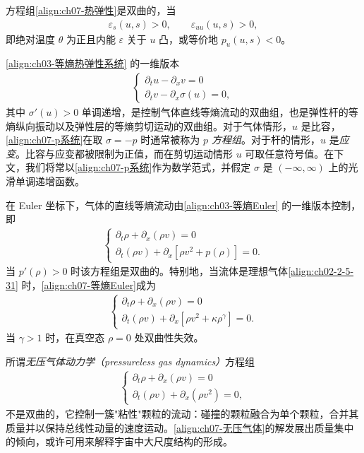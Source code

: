 \documentclass[../../main.tex]{subfiles}
\begin{document}
方程组\eqref{align:ch07-热弹性}是双曲的，当
\begin{align}
\varepsilon_s(u,s)>0,\qquad \varepsilon_{uu}(u,s)>0,
\label{align:ch07-热弹性双曲}
\end{align}
即绝对温度 $\theta$ 为正且内能 $\varepsilon$ 关于 $u$ 凸，或等价地 $p_u(u,s)<0$。

\eqref{align:ch03-等熵热弹性系统}
的一维版本
\begin{align}
\begin{cases}
\partial_t u-\partial_x v=0\\
\partial_t v-\partial_x\sigma(u)=0,
\end{cases}
\label{align:ch07-p系统}
\end{align}
其中 $\sigma'(u)>0$ 单调递增，是控制气体直线等熵流动的双曲组，也是弹性杆的等熵纵向振动以及弹性层的等熵剪切运动的双曲组。对于气体情形，$u$ 是比容，\eqref{align:ch07-p系统}在取 $\sigma=-p$ 时通常被称为 \emph{$p$ 方程组}。对于杆的情形，$u$ 是\emph{应变}。比容与应变都被限制为正值，而在剪切运动情形 $u$ 可取任意符号值。在下文，我们将常以\eqref{align:ch07-p系统}作为数学范式，并假定 $\sigma$ 是 $(-\infty,\infty)$ 上的光滑单调递增函数。

在 Euler 坐标下，气体的直线等熵流动由\eqref{align:ch03-等熵Euler}
的一维版本控制，即
\begin{align}
\begin{cases}
\partial_t\rho+\partial_x(\rho v)=0\\
\partial_t(\rho v)+\partial_x[\rho v^2+p(\rho)]=0.
\end{cases}
\label{align:ch07-等熵Euler}
\end{align}
当 $p'(\rho)>0$ 时该方程组是双曲的。特别地，当流体是理想气体\eqref{align:ch02-2-5-31}
时，\eqref{align:ch07-等熵Euler}成为
\begin{align}
\begin{cases}
\partial_t\rho+\partial_x(\rho v)=0\\
\partial_t(\rho v)+\partial_x[\rho v^2+\kappa\rho^\gamma]=0.
\end{cases}
\label{align:ch07-理想气体}
\end{align}
当 $\gamma>1$ 时，在真空态 $\rho=0$ 处双曲性失效。

所谓\emph{无压气体动力学（pressureless gas dynamics）}方程组
\begin{align}
\begin{cases}
\partial_t\rho+\partial_x(\rho v)=0\\
\partial_t(\rho v)+\partial_x(\rho v^2)=0,
\end{cases}
\label{align:ch07-无压气体}
\end{align}
不是双曲的，它控制一簇"粘性"颗粒的流动：碰撞的颗粒融合为单个颗粒，合并其质量并以保持总线性动量的速度运动。\eqref{align:ch07-无压气体}的解发展出质量集中的倾向，或许可用来解释宇宙中大尺度结构的形成。
\end{document}
